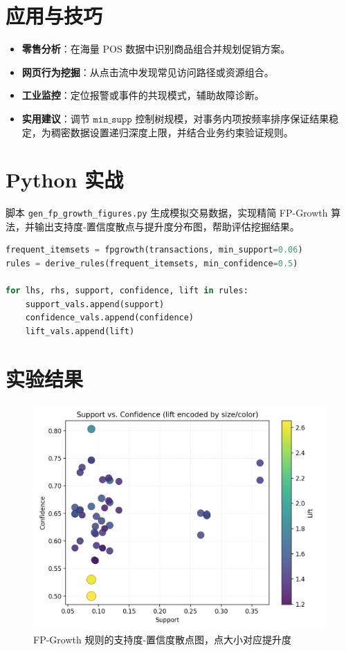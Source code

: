 \documentclass[UTF8,zihao=-4]{ctexart}
\begin{document}
\section{应用与技巧}
\begin{itemize}
  \item \textbf{零售分析}：在海量 POS 数据中识别商品组合并规划促销方案。
  \item \textbf{网页行为挖掘}：从点击流中发现常见访问路径或资源组合。
  \item \textbf{工业监控}：定位报警或事件的共现模式，辅助故障诊断。
  \item \textbf{实用建议}：调节 \(\texttt{min\_supp}\) 控制树规模，对事务内项按频率排序保证结果稳定，为稠密数据设置递归深度上限，并结合业务约束验证规则。
\end{itemize}

\section{Python 实战}
脚本 \texttt{gen\_fp\_growth\_figures.py} 生成模拟交易数据，实现精简 FP-Growth 算法，并输出支持度-置信度散点与提升度分布图，帮助评估挖掘结果。
\begin{lstlisting}[language=Python,caption={脚本 gen_fp_growth_figures.py 片段}]
frequent_itemsets = fpgrowth(transactions, min_support=0.06)
rules = derive_rules(frequent_itemsets, min_confidence=0.5)

for lhs, rhs, support, confidence, lift in rules:
    support_vals.append(support)
    confidence_vals.append(confidence)
    lift_vals.append(lift)
\end{lstlisting}

\section{实验结果}
\begin{figure}[H]
  \centering
  \includegraphics[width=0.82\linewidth]{fpgrowth_support_confidence.png}
  \caption{FP-Growth 规则的支持度-置信度散点图，点大小对应提升度}
  \label{fig:fpgrowth_support_confidence_cn}
\end{figure}
\end{document}
